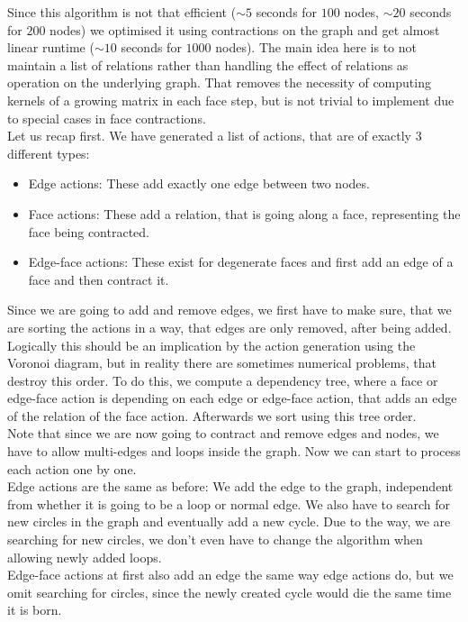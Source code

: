 \documentclass[11pt, a4paper, UKenglish]{article}
\begin{document}
    Since this algorithm is not that efficient ($\sim5$ seconds for $100$ nodes, $\sim20$ seconds for $200$ nodes) we optimised it using contractions on the graph and get almost linear runtime ($\sim10$ seconds for $1000$ nodes).
    The main idea here is to not maintain a list of relations rather than handling the effect of relations as operation on the underlying graph.
    That removes the necessity of computing kernels of a growing matrix in each face step, but is not trivial to implement due to special cases in face contractions.\\
    Let us recap first.
    We have generated a list of actions, that are of exactly 3 different types:
    \begin{itemize}
        \item Edge actions: These add exactly one edge between two nodes.
        \item Face actions: These add a relation, that is going along a face, representing the face being contracted.
        \item Edge-face actions: These exist for degenerate faces and first add an edge of a face and then contract it.
    \end{itemize}
    Since we are going to add and remove edges, we first have to make sure, that we are sorting the actions in a way, that edges are only removed, after being added.
    Logically this should be an implication by the action generation using the Voronoi diagram, but in reality there are sometimes numerical problems, that destroy this order.
    To do this, we compute a dependency tree, where a face or edge-face action is depending on each edge or edge-face action, that adds an edge of the relation of the face action.
    Afterwards we sort using this tree order.\\
    Note that since we are now going to contract and remove edges and nodes, we have to allow multi-edges and loops inside the graph.
    Now we can start to process each action one by one.\\
    Edge actions are the same as before: We add the edge to the graph, independent from whether it is going to be a loop or normal edge.
    We also have to search for new circles in the graph and eventually add a new cycle.
    Due to the way, we are searching for new circles, we don't even have to change the algorithm when allowing newly added loops.\\
    Edge-face actions at first also add an edge the same way edge actions do, but we omit searching for circles, since the newly created cycle would die the same time it is born.
\end{document}
